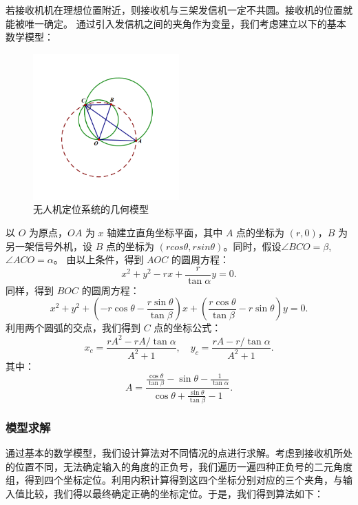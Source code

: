 \documentclass{my_paper}
\begin{document}
若接收机机在理想位置附近，则接收机与三架发信机一定不共圆。接收机的位置就能被唯一确定。
通过引入发信机之间的夹角作为变量，我们考虑建立以下的基本数学模型：

\begin{figure}[H]
    \centering
    \includegraphics[width=0.5\textwidth]{sketch2}
    \caption{无人机定位系统的几何模型} 
\end{figure}

以 $O$ 为原点，$OA$ 为 $x$ 轴建立直角坐标平面，其中 $A$ 点的坐标为 $(r,0)$，$B$ 为另一架信号外机，设 $B$ 点的坐标为 $(rcos\theta,rsin\theta)$。同时，假设$\angle B C O = \beta$, $ \angle A C O = \alpha$。
由以上条件，得到 $AOC$ 的圆周方程：
$$
x ^ { 2 } + y ^ { 2 } - r x + \frac { r } { \tan \alpha } y = 0.
$$
同样，得到 $BOC$ 的圆周方程：
$$
x ^ { 2 } + y ^ { 2 } + ( - r \cos \theta - \frac { r \sin \theta } { \tan \beta } ) x + ( \frac { r \cos \theta } { \tan \beta } - r \sin \theta ) y = 0.
$$
利用两个圆弧的交点，我们得到 $C$ 点的坐标公式：
$$
x _ { c } = \frac { r A ^ { 2 } - r A / \tan \alpha } { A ^ { 2 } + 1 }, 
\quad y _ { c } = \frac { r A - r / \tan \alpha } { A ^ { 2 } + 1 }.
$$
其中：
$$
A = \frac { \frac { \cos \theta } { \tan \beta } - \sin \theta - \frac { 1 } { \tan \alpha } } { \cos \theta + \frac { \sin \theta } { \tan \beta } - 1 }.
$$

\subsubsection{模型求解}

通过基本的数学模型，我们设计算法对不同情况的点进行求解。考虑到接收机所处的位置不同，无法确定输入的角度的正负号，我们遍历一遍四种正负号的二元角度组，得到四个坐标定位。利用内积计算得到这四个坐标分别对应的三个夹角，与输入值比较，我们得以最终确定正确的坐标定位。于是，我们得到算法如下：
\end{document}
